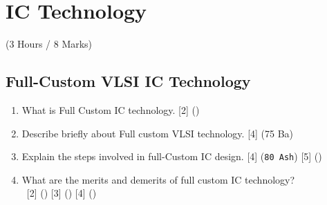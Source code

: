 \documentclass[12pt]{article}
\newcommand{\enter}{\\\textcolor{white}{1}}
\begin{document}
\pagebreak

\section{IC Technology}
  \begin{center}(3 Hours / 8 Marks)\end{center}

  \subsection{Full-Custom VLSI IC Technology}
    \begin{enumerate}
      \item What is Full Custom IC technology. \hfill [2] ()

      \item Describe briefly about Full custom VLSI technology. \hfill [4] (75 Ba)

      \item Explain the steps involved in full-Custom IC design. \hfill [4] (\texttt{80 Ash}) [5] ()

      \item What are the merits and demerits of full custom IC technology?
        \enter\hfill [2] () [3] () [4] ()

    \end{enumerate}
\end{document}
